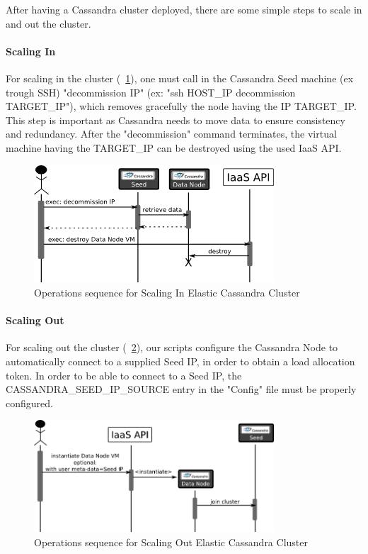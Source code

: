 \documentclass[10pt]{report}
\begin{document}
After having a Cassandra cluster deployed, there are some simple steps to scale in and out the cluster.
\paragraph{Scaling In} For scaling in the cluster (\figurename~\ref{fig:scaleIn}), one must call in the Cassandra Seed machine (ex trough SSH) "decommission IP" (ex: "ssh HOST\_IP decommission TARGET\_IP"), which removes gracefully the node having the IP TARGET\_IP. This step is important as Cassandra needs to move data to ensure consistency and redundancy. After the "decommission" command terminates, the virtual machine having the TARGET\_IP can be destroyed using the used IaaS API.

\begin{figure}
\centering
\includegraphics[width=0.8\textwidth]{./scaleIn.png}
\caption{Operations sequence for Scaling In Elastic Cassandra Cluster}
\label{fig:scaleIn}
\end{figure} 
 
 
\paragraph{Scaling Out} For scaling out the cluster (\figurename~\ref{fig:scaleOut}), our scripts configure the Cassandra Node to automatically connect to a supplied Seed IP, in order to obtain a load allocation token. In order to be able to connect to a Seed IP, the CASSANDRA\_SEED\_IP\_SOURCE entry in the "Config" file must be properly configured.


\begin{figure}
\centering
\includegraphics[width=0.8\textwidth]{./scaleOut.png}
\caption{Operations sequence for Scaling Out Elastic Cassandra Cluster}
\label{fig:scaleOut}
\end{figure} 
\end{document}
